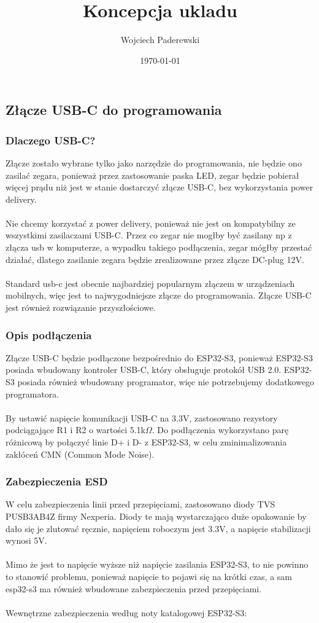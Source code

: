 \documentclass[../main.tex]{subfiles}
\author{Wojciech Paderewski}
\date{\today}
\title{Koncepcja ukladu}
\begin{document}
\subsection{Złącze USB-C do programowania}
\subsubsection{Dlaczego USB-C?}
Złącze zostało wybrane tylko jako narzędzie do programowania, nie będzie ono zasilać zegara, ponieważ przez zastosowanie paska LED, zegar będzie pobierał więcej prądu niż jest w stanie dostarczyć złącze USB-C, 
bez wykorzystania power delivery.
\\\\
Nie chcemy korzystać z power delivery, ponieważ nie jest on kompatybilny ze wszystkimi zasilaczami USB-C. Przez co zegar nie mogłby być zasilany np z złącza usb w komputerze,
a wypadku takiego podłączenia, zegar mógłby przestać działać, dlatego zasilanie zegara będzie zrealizowane przez złącze DC-plug 12V. 
\\\\
Standard usb-c jest obecnie najbardziej popularnym złączem w urządzeniach mobilnych,
więc jest to najwygodniejsze złącze do programowania. Złącze USB-C jest również rozwiązanie przyszłościowe.

\subsubsection{Opis podłączenia}
Złącze USB-C będzie podłączone bezpośrednio do ESP32-S3, ponieważ ESP32-S3 posiada wbudowany kontroler USB-C, 
który obsługuje protokół USB 2.0. ESP32-S3 posiada również wbudowany programator, więc nie potrzebujemy dodatkowego programatora.
\\\\
By ustawić napięcie komunikacji USB-C na 3.3V, zastosowano rezystory podciągające R1 i R2 o wartości 5.1k$\Omega$.
Do podłączenia wykorzystano parę różnicową by połączyć linie D+ i D- z ESP32-S3, w celu zminimalizowania zakłóceń CMN (Common Mode Noise).

\subsubsection{Zabezpieczenia ESD}

W celu zabezpieczenia linii przed przepięciami, zastosowano diody TVS PUSB3AB4Z firmy Nexperia. Diody te mają wystarczająco duże opakowanie by dało się je zlutować ręcznie, napięciem roboczym jest 3.3V,
a napięcie stabilizacji wynosi 5V. 
\\\\
Mimo że jest to napięcie wyższe niż napięcie zasilania ESP32-S3, to nie powinno to stanowić problemu, 
ponieważ napięcie to pojawi się na krótki czas, a sam esp32-s3 ma również wbudowane zabezpieczenia przed przepięciami.
\\\\
Wewnętrzne zabezpieczenia według noty katalogowej ESP32-S3:
\end{document}
